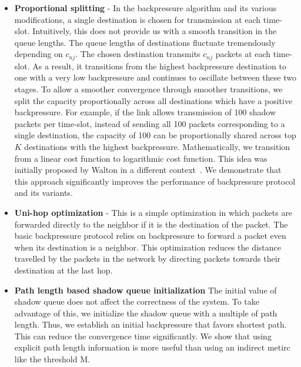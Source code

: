 \begin{itemize}[leftmargin=*]
\item[] \textbf{Proportional splitting} - In the backpressure algorithm and its various modifications, a single destination is chosen for transmission at each time-slot. Intuitively, this does not provide us with a smooth transition in the queue lengths. The queue lengths of destinations fluctuate tremendously depending on $c_{nj}$. The chosen destination transmits $c_{nj}$ packets at each time-slot. As a result, it transitions from the highest backpressure destination to one with a very low backpressure and continues to oscillate between these two stages. To allow a smoother convergence through smoother transitions, we split the capacity proportionally across all destinations which have a positive backpressure. For example, if the link allows transmission of 100 shadow packets per time-slot, instead of sending all 100 packets corresponding to a single destination, the capacity of 100 can be proportionally shared across top $K$ destinations with the highest backpressure. Mathematically, we transition from a linear cost function to logarithmic cost function. This idea was initially proposed by Walton in a different context~\cite{walton}. We demonstrate that this approach significantly improves the performance of backpressure protocol and its variants.
   
\item[] \textbf{Uni-hop optimization} - This is a simple optimization in which packets are forwarded directly to the neighbor if it is the destination of the packet. The basic backpressure protocol relies on backpressure to forward a packet even when its destination is a neighbor. This optimization reduces the distance travelled by the packets in the network by directing packets towards their destination at the last hop.
 
   
\item[] \textbf{Path length based shadow queue initialization}  The initial value of shadow queue does not affect the correctness of the system. To take advantage of this, we initialize the shadow queue with a multiple of path length. Thus, we establish an initial backpressure that favors shortest path. This can reduce the convergence time significantly. We show that using explicit path length information is more useful than using an indirect metirc like the threshold M.

\end{itemize}
 